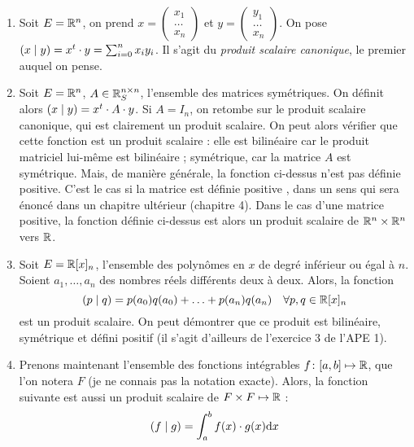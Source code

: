 \begin{enumerate}
\item Soit $E = \mathbb{R}^n$, on prend $x = \begin{pmatrix} x_1 \\ \ldots \\ x_n \end{pmatrix}$ et $y = \begin{pmatrix} y_1 \\ \ldots \\ x_n \end{pmatrix}$. On pose $\left( x \mid y \right) = x^t \cdot y = \sum_{i=0}^{n} x_iy_i$. Il s'agit du \emph{produit scalaire canonique}, le premier auquel on pense.

\item Soit $E=\mathbb{R}^n$, $A \in \mathbb{R}^{n \times n}_S$, l'ensemble des matrices symétriques. On définit alors $\left( x \mid y \right) = x^t \cdot A \cdot y$. Si $A=I_n$, on retombe sur le produit scalaire canonique, qui est clairement un produit scalaire. On peut alors vérifier que cette fonction est un produit scalaire : elle est bilinéaire car le produit matriciel lui-même est bilinéaire ; symétrique, car la matrice $A$ est symétrique. Mais, de manière générale, la fonction ci-dessus n'est pas définie positive. C'est le cas si la matrice est \og définie positive \fg{}, dans un sens qui sera énoncé dans un chapitre ultérieur (chapitre 4). Dans le cas d'une matrice positive, la fonction définie ci-dessus est alors un produit scalaire de $\mathbb{R}^n \times \mathbb{R}^n$ vers $\mathbb{R}$.

\item Soit $E=\mathbb{R}[x]_n$, l'ensemble des polynômes en $x$ de degré inférieur ou égal à $n$. Soient $a_1, \ldots, a_n$ des nombres réels différents deux à deux. Alors, la fonction
$$\left( p \mid q \right) = p(a_0)q(a_0) + \ldots + p(a_n)q(a_n) \quad \forall p, q \in \mathbb{R}[x]_n$$
est un produit scalaire. On peut démontrer que ce produit est bilinéaire, symétrique et défini positif (il s'agit d'ailleurs de l'exercice 3 de l'APE 1).

\item Prenons maintenant l'ensemble des fonctions intégrables $f \colon [a, b] \mapsto \mathbb{R}$, que l'on notera $F$ (je ne connais pas la notation exacte). Alors, la fonction suivante est aussi un produit scalaire de $F \times F \mapsto \mathbb{R}$ :
\[ \left( f \mid g \right) = \int_{a}^{b} f(x)\cdot g(x) \mathrm{d}x \]
\end{enumerate}


